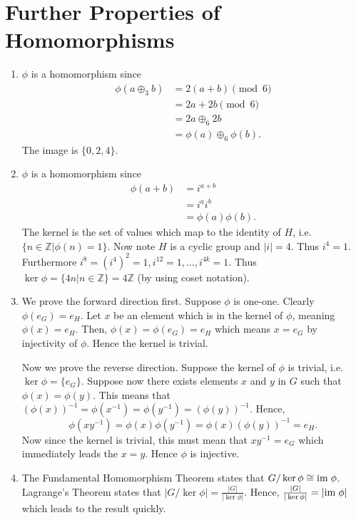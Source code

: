 \section{Further Properties of Homomorphisms}
\begin{enumerate}
    \item $\phi$ is a homomorphism since
    \begin{align*}
        \phi(a \oplus_3 b) &= 2(a+b) \pmod{6}\\
        &= 2a + 2b \pmod{6}\\
        &= 2a \oplus_6 2b\\
        &= \phi(a) \oplus_6 \phi(b).
    \end{align*}
    The image is $\{0, 2, 4\}$.

    \item $\phi$ is a homomorphism since
    \begin{align*}
        \phi(a+b) &= i^{a+b}\\
        &=i^ai^b\\
        &=\phi(a)\phi(b).
    \end{align*}
    The kernel is the set of values which map to the identity of $H$, i.e. $\{n \in \mathbb{Z} \vert \phi(n) = 1\}$. Now note $H$ is a cyclic group and $|i| = 4$. Thus $i^4 = 1$. Furthermore $i^8 = (i^4)^2 = 1, i^{12} = 1, \dots, i^{4k} = 1$. Thus $\ker\phi = \{4n \vert n \in \mathbb{Z}\} = 4\mathbb{Z}$ (by using coset notation).

    \item We prove the forward direction first. Suppose $\phi$ is one-one. Clearly $\phi(e_G) = e_H$. Let $x$ be an element which is in the kernel of $\phi$, meaning $\phi(x) = e_H$. Then, $\phi(x) = \phi(e_G) = e_H$ which means $x = e_G$ by injectivity of $\phi$. Hence the kernel is trivial.

    Now we prove the reverse direction. Suppose the kernel of $\phi$ is trivial, i.e. $\ker \phi = \{e_G\}$. Suppose now there exists elements $x$ and $y$ in $G$ such that $\phi(x) = \phi(y)$. This means that $(\phi(x))^{-1} = \phi(x^{-1}) = \phi(y^{-1}) = (\phi(y))^{-1}$. Hence,
    \[
        \phi(xy^{-1}) = \phi(x)\phi(y^{-1}) = \phi(x)\left(\phi(y)\right)^{-1} = e_H.
    \]
    Now since the kernel is trivial, this must mean that $xy^{-1} = e_G$ which immediately leads the $x=y$. Hence $\phi$ is injective.

    \item The Fundamental Homomorphism Theorem states that $G / \ker \phi \cong \mathrm{im}\; \phi$. Lagrange's Theorem states that $|G / \ker \phi| = \frac{|G|}{|\ker\phi|}$. Hence, $\frac{|G|}{|\ker\phi|} = |\mathrm{im}\;\phi|$ which leads to the result quickly.


\end{enumerate}
